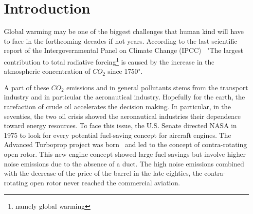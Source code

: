 
\chapter{Introduction}

Global warming may be one of the biggest challenges that human kind
will have to face in the forthcoming decades if not years.
According to the last scientific
report of the Intergovernmental Panel on Climate Change 
(IPCC)~\cite{IPCC2013}
"The largest contribution to total radiative 
forcing\footnote{namely global warming} 
is caused by the increase in the atmospheric 
concentration of $CO_2$ since 1750".

A part of these $CO_2$ emissions and in general pollutants stems from the
transport industry and in particular the
aeronautical industry. 
Hopefully for the earth,
the rarefaction of crude oil accelerates the decision making.
In particular, in the seventies, the two oil crisis showed the aeronautical 
industries their dependence toward energy resources. 
To face this issue, the U.S. Senate directed NASA in 1975
to look for every potential fuel-saving concept for aircraft
engines. The Advanced Turboprop
project was born~\cite{Hager1988} and led to the
concept of contra-rotating open rotor. This new
engine concept showed large fuel savings
but involve higher noise emissions due to the absence of
a duct. The high noise emissions 
combined with the decrease of the price of the
barrel in the late eighties, the contra-rotating open rotor 
never reached the commercial aviation.

